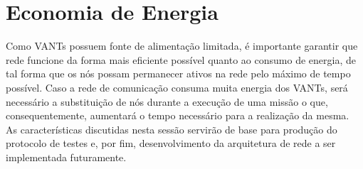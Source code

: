 \section{Economia de Energia}

Como VANTs possuem fonte de alimentação limitada, é importante garantir que rede funcione da forma mais eficiente possível quanto ao consumo de energia, de tal forma que os nós possam permanecer ativos na rede pelo máximo de tempo possível. Caso a rede de comunicação consuma muita energia dos VANTs, será necessário a substituição de nós durante a execução de uma missão o que, consequentemente, aumentará o tempo necessário para a realização da mesma.\\

As características discutidas nesta sessão servirão de base para produção do protocolo de testes e, por fim, desenvolvimento da arquitetura de rede a ser implementada futuramente. 